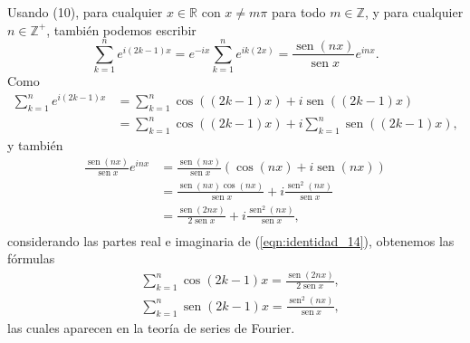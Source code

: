 \begin{remark} 
  Usando (10), para cualquier $x \in \mathbb{R}$ con $x \neq m \pi$ para todo $m \in \mathbb{Z}$, y para cualquier $n \in \mathbb{Z}^{+}$, también podemos escribir
  \begin{equation}\label{eqn:identidad_14}
  \sum_{k=1}^{n} e^{i(2 k-1) x}=e^{-i x} \sum_{k=1}^{n} e^{i k(2 x)}=\frac{\operatorname{sen} (n x)}{\operatorname{sen} x} e^{i n x}.
  \end{equation}
  Como
  \begin{align*}
  \sum_{k=1}^{n} e^{i(2 k-1) x}&=\sum_{k=1}^{n} \cos ((2 k-1) x)+i \operatorname{sen}((2 k-1) x)\\[2ex]
  &=\sum_{k=1}^{n} \cos ((2 k-1) x)+i \sum_{k=1}^{n} \operatorname{sen}((2 k-1) x) \text {, }
  \end{align*}
  y también
  $$
  \begin{aligned}
  \frac{\operatorname{sen}(n x)}{\operatorname{sen} x} e^{i n x} & =\frac{\operatorname{sen}(n x)}{\operatorname{sen} x}(\cos (n x)+i \operatorname{sen}(n x)) \\[2ex]
  & =\frac{\operatorname{sen}(n x) \cos (n x)}{\operatorname{sen} x}+i \frac{\operatorname{sen}^{2}(n x)}{\operatorname{sen} x} \\[2ex]
  & =\frac{\operatorname{sen}(2 n x)}{2 \operatorname{sen} x}+i \frac{\operatorname{sen}^{2}(n x)}{\operatorname{sen} x},\\[2ex]
  \end{aligned}
  $$
  considerando las partes real e imaginaria de (\ref{eqn:identidad_14}), obtenemos las fórmulas
  $$
  \begin{aligned}
  & \sum_{k=1}^{n} \cos (2 k-1) x=\frac{\operatorname{sen} (2 n x)}{2 \operatorname{sen} x}, \\
  & \sum_{k=1}^{n} \operatorname{sen} (2 k-1) x=\frac{\operatorname{sen} ^{2} (n x)}{\operatorname{sen} x},
  \end{aligned}
  $$
  las cuales aparecen en la teoría de series de Fourier.
\end{remark}



